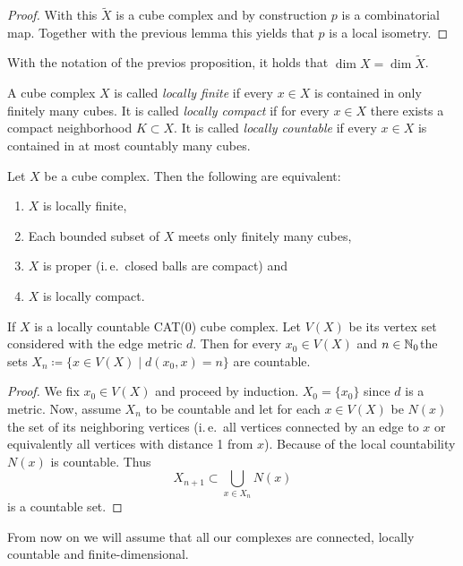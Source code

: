 \begin{proof}
  With this \(\tilde X\) is a cube complex and by construction \(p\) is a combinatorial map. Together with the previous lemma this yields that \(p\) is a local isometry.
\end{proof}

\begin{cor}
  With the notation of the previos proposition, it holds that \(\dim X = \dim \tilde X\).
\end{cor}


\begin{defin}
  A cube complex \(X\) is called \emph{locally finite} if every \(x \in X\) is contained in only finitely many cubes. It is called \emph{locally compact} if for every \(x \in X\) there exists a compact neighborhood \(K \subset X\). It is called \emph{locally countable} if every \(x \in X\) is contained in at most countably many cubes.
\end{defin}

\begin{prop}
  Let \(X\) be a cube complex. Then the following are equivalent:
  \begin{enumerate}
  \item \(X\) is locally finite,
  \item Each bounded subset of \(X\) meets only finitely many cubes,
  \item \(X\) is proper (i.\,e.\ closed balls are compact) and
  \item \(X\) is locally compact.
  \end{enumerate}
\end{prop}

\begin{lemma}
  \label{lem:lf-countable}
  If \(X\) is a locally countable CAT(0) cube complex. Let \(V(X)\) be its vertex set considered with the edge metric \(d\). Then for every \(x_0 \in V(X)\) and \(n \in \mathbb{N}_0\)the sets \(X_n \coloneqq \{x \in V(X) \mid d(x_0, x) = n\}\) are countable.
\end{lemma}

\begin{proof}
  We fix \(x_0 \in V(X)\) and proceed by induction. \(X_0 = \{x_0\}\) since \(d\) is a metric. Now, assume \(X_n\) to be countable and let for each \(x \in V(X)\) be \(N(x)\) the set of its neighboring vertices (i.\,e.\ all vertices connected by an edge to \(x\) or equivalently all vertices with distance 1 from \(x\)). Because of the local countability \(N(x)\) is countable. Thus
  \[
    X_{n+1} \subset \bigcup_{x \in X_n} N(x)
  \]
  is a countable set.
\end{proof}


\begin{rem}
  From now on we will assume that all our complexes are connected, locally countable and finite-dimensional.
\end{rem}

